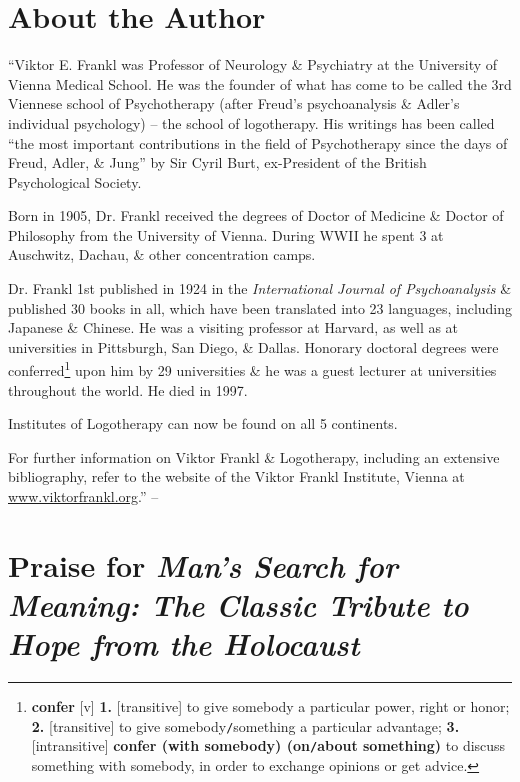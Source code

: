\documentclass[oneside]{book}
\numberwithin{equation}{section}
\begin{document}

\section*{About the Author}
``Viktor E. Frankl was Professor of Neurology \& Psychiatry at the University of Vienna Medical School. He was the founder of what has come to be called the 3rd Viennese school of Psychotherapy (after Freud's psychoanalysis \& Adler's individual psychology) -- the school of logotherapy. His writings has been called ``the most important contributions in the field of Psychotherapy since the days of Freud, Adler, \& Jung'' by Sir Cyril Burt, ex-President of the British Psychological Society.

Born in 1905, Dr. Frankl received the degrees of Doctor of Medicine \& Doctor of Philosophy from the University of Vienna. During WWII he spent 3 at Auschwitz, Dachau, \& other concentration camps.

Dr. Frankl 1st published in 1924 in the \textit{International Journal of Psychoanalysis} \& published 30 books in all, which have been translated into 23 languages, including Japanese \& Chinese. He was a visiting professor at Harvard, as well as at  universities in Pittsburgh, San Diego, \& Dallas. Honorary doctoral degrees were conferred\footnote{\textbf{confer} [v] \textbf{1.} [transitive] to give somebody a particular power, right or honor; \textbf{2.} [transitive] to give somebody\texttt{/}something a particular advantage; \textbf{3.} [intransitive] \textbf{confer (with somebody) (on\texttt{/}about something)} to discuss something with somebody, in order to exchange opinions or get advice.} upon him by 29 universities \& he was a guest lecturer at universities throughout the world. He died in 1997.

Institutes of Logotherapy can now be found on all 5 continents.

For further information on Viktor Frankl \& Logotherapy, including an extensive bibliography, refer to the website of the Viktor Frankl Institute, Vienna at \url{www.viktorfrankl.org}.'' -- \cite[p. 4]{Frankl2013}


\section*{Praise for \textit{Man's Search for Meaning: The Classic Tribute to Hope from the Holocaust}}
\end{document}

